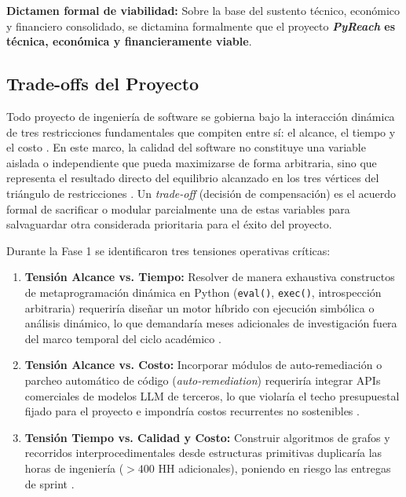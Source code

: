 \vspace{0.2cm}
\noindent
\textbf{Dictamen formal de viabilidad:} Sobre la base del sustento técnico, económico y financiero consolidado, se dictamina formalmente que el proyecto \textbf{\textit{PyReach} es técnica, económica y financieramente viable}. %

\subsection{Trade-offs del Proyecto}
Todo proyecto de ingeniería de software se gobierna bajo la interacción dinámica de tres restricciones fundamentales que compiten entre sí: el alcance, el tiempo y el costo \parencite{pmi2021pmbok, torres2026proyecto}. %
En este marco, la calidad del software no constituye una variable aislada o independiente que pueda maximizarse de forma arbitraria, sino que representa el resultado directo del equilibrio alcanzado en los tres vértices del triángulo de restricciones \parencite{pressman2020software, wiegers2013software}. %
Un \textit{trade-off} (decisión de compensación) es el acuerdo formal de sacrificar o modular parcialmente una de estas variables para salvaguardar otra considerada prioritaria para el éxito del proyecto. %

Durante la Fase 1 se identificaron tres tensiones operativas críticas:
\begin{enumerate}[leftmargin=1.27cm, label=\alph*)]
    \item \textbf{Tensión Alcance vs. Tiempo:} Resolver de manera exhaustiva constructos de metaprogramación dinámica en Python (\texttt{eval()}, \texttt{exec()}, introspección arbitraria) requeriría diseñar un motor híbrido con ejecución simbólica o análisis dinámico, lo que demandaría meses adicionales de investigación fuera del marco temporal del ciclo académico \parencite{salis2021pycg}. %
    \item \textbf{Tensión Alcance vs. Costo:} Incorporar módulos de auto-remediación o parcheo automático de código (\textit{auto-remediation}) requeriría integrar APIs comerciales de modelos LLM de terceros, lo que violaría el techo presupuestal fijado para el proyecto e impondría costos recurrentes no sostenibles \parencite{bogart2016break, gutierrez2024auditoria}. %
    \item \textbf{Tensión Tiempo vs. Calidad y Costo:} Construir algoritmos de grafos y recorridos interprocedimentales desde estructuras primitivas duplicaría las horas de ingeniería ($>400\text{ HH}$ adicionales), poniendo en riesgo las entregas de sprint \parencite{torres2026proyecto}. %
\end{enumerate}

